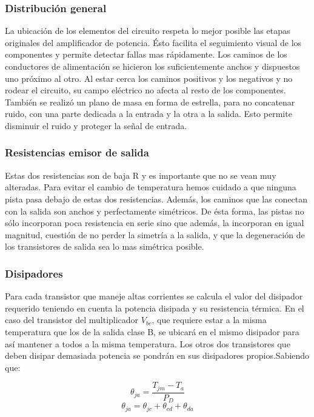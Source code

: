 \subsubsection*{Distribución general}
La ubicación de los elementos del circuito respeta lo mejor posible las etapas originales del amplificador de potencia. Ésto facilita el seguimiento visual de los componentes y permite detectar fallas mas rápidamente.
Los caminos de los conductores de alimentación se hicieron los suficientemente anchos y dispuestos uno próximo al otro. Al estar cerca los caminos positivos y los negativos y no rodear el circuito, su campo eléctrico no afecta al resto de los componentes.
También se realizó un plano de masa en forma de estrella, para no concatenar ruido, con una parte dedicada a la entrada y la otra a la salida. Esto permite disminuir el ruido y proteger la señal de entrada.



\subsubsection*{Resistencias emisor de salida}
Estas dos resistencias son de baja R y es importante que no se vean muy alteradas. Para evitar el cambio de temperatura hemos cuidado a que ninguna pista pasa debajo de estas dos resistencias. Además, los caminos que las conectan con la salida son anchos y perfectamente simétricos. De ésta forma, las pistas no sólo incorporan poca resistencia en serie sino que además, la incorporan en igual magnitud, cuestión de no perder la simetría a la salida, y que la degeneración de los transistores de salida sea lo mas simétrica posible.
\bigskip

\subsubsection{Disipadores}

Para cada transistor que maneje altas corrientes se calcula el valor del disipador requerido teniendo en cuenta la potencia disipada y su resistencia térmica. En el caso del transistor del multiplicador $V_{be}$, que requiere estar a la misma temperatura que los de la salida clase B, se ubicará en el mismo disipador para así mantener a todos a la misma temperatura. Los otros dos transistores que deben disipar demasiada potencia se pondrán en sus disipadores propios.Sabiendo que:

$$
   \theta_{ja}=\dfrac{T_{jm}-T_a}{P_D}
$$
$$
	\theta_{ja}=\theta_{jc}+\theta_{cd}+\theta_{da}
$$

